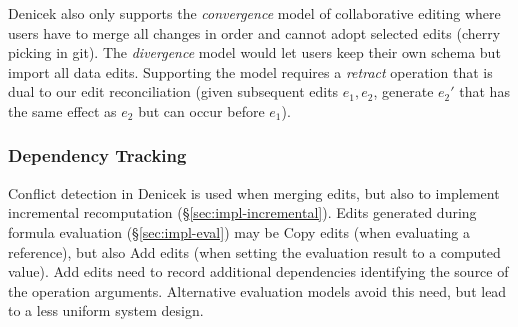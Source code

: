 \documentclass[sigconf]{acmart}
\newcommand{\ident}[1]{{\sffamily #1}}
\begin{document}
Denicek also only supports the \emph{convergence} model of collaborative editing \cite{edwards-2025-schema}
where users have to merge all changes in order and cannot adopt selected edits (cherry
picking in git). The \emph{divergence} model would let users keep their own schema but
import all data edits. Supporting the model requires a \emph{retract} operation \cite{edwards-2021-typed}
that is dual to our edit reconciliation (given subsequent edits $e_1, e_2$, generate
$e_2'$ that has the same effect as $e_2$ but can occur before $e_1$).

\subsubsection*{Dependency Tracking}
Conflict detection in Denicek is used when merging edits, but also to implement
incremental recomputation (\S\ref{sec:impl-incremental}). Edits generated during formula evaluation
(\S\ref{sec:impl-eval}) may be \ident{Copy} edits (when evaluating a reference), but also
\ident{Add} edits (when setting the evaluation result to a computed value). \ident{Add} edits
need to record additional dependencies identifying the source of the operation arguments.
Alternative evaluation models avoid this need, but lead to a less uniform system design.

%

\end{document}
